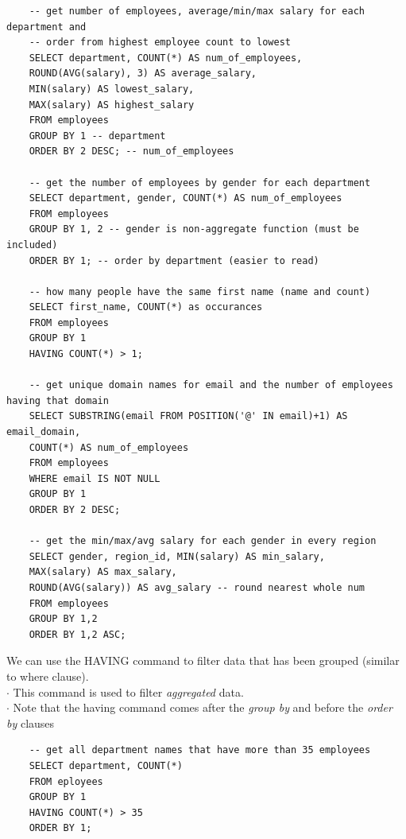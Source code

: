 \documentclass[11pt, a4paper]{article}
\begin{document}
\begin{spacing}{1.1}
\begin{lstlisting}
	-- get number of employees, average/min/max salary for each department and
	-- order from highest employee count to lowest
	SELECT department, COUNT(*) AS num_of_employees,
	ROUND(AVG(salary), 3) AS average_salary,
	MIN(salary) AS lowest_salary,
	MAX(salary) AS highest_salary
	FROM employees
	GROUP BY 1 -- department
	ORDER BY 2 DESC; -- num_of_employees 
	
	-- get the number of employees by gender for each department
	SELECT department, gender, COUNT(*) AS num_of_employees
	FROM employees
	GROUP BY 1, 2 -- gender is non-aggregate function (must be included)
	ORDER BY 1; -- order by department (easier to read) 
	
	-- how many people have the same first name (name and count)
	SELECT first_name, COUNT(*) as occurances
	FROM employees
	GROUP BY 1
	HAVING COUNT(*) > 1;
	
	-- get unique domain names for email and the number of employees having that domain
	SELECT SUBSTRING(email FROM POSITION('@' IN email)+1) AS email_domain, 
	COUNT(*) AS num_of_employees
	FROM employees
	WHERE email IS NOT NULL
	GROUP BY 1
	ORDER BY 2 DESC;
	
	-- get the min/max/avg salary for each gender in every region
	SELECT gender, region_id, MIN(salary) AS min_salary, 
	MAX(salary) AS max_salary, 
	ROUND(AVG(salary)) AS avg_salary -- round nearest whole num
	FROM employees
	GROUP BY 1,2
	ORDER BY 1,2 ASC; \end{lstlisting} \vspace*{1mm}
	We can use the HAVING command to filter data that has been grouped (similar to where clause). \\
	\hspace*{3mm} $\cdot$ This command is used to filter \textit{aggregated} data. \\
	\hspace*{3mm} $\cdot$ Note that the having command comes after the \textit{group by} and before the \textit{order by} clauses
	\begin{lstlisting}
	-- get all department names that have more than 35 employees
	SELECT department, COUNT(*) 
	FROM eployees
	GROUP BY 1
	HAVING COUNT(*) > 35
	ORDER BY 1;	\end{lstlisting} \newpage
	

\end{spacing}
\end{document}
